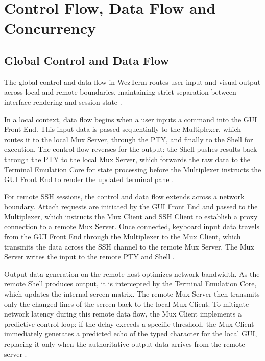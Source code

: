 \section{Control Flow, Data Flow and Concurrency}
\label{sec:control-data-concurrency}

\subsection{Global Control and Data Flow}
\label{sec:global-flow}

The global control and data flow in WezTerm routes user input and visual output across local and remote boundaries, maintaining strict separation between interface rendering and session state \cite{multiplexing,sshdomain,term-crate}.

In a local context, data flow begins when a user inputs a command into the GUI Front End. This input data is passed sequentially to the Multiplexer, which routes it to the local Mux Server, through the PTY, and finally to the Shell for execution. The control flow reverses for the output: the Shell pushes results back through the PTY to the local Mux Server, which forwards the raw data to the Terminal Emulation Core for state processing before the Multiplexer instructs the GUI Front End to render the updated terminal pane \cite{mux-api,term-crate}.

For remote SSH sessions, the control and data flow extends across a network boundary. Attach requests are initiated by the GUI Front End and passed to the Multiplexer, which instructs the Mux Client and SSH Client to establish a proxy connection to a remote Mux Server. Once connected, keyboard input data travels from the GUI Front End through the Multiplexer to the Mux Client, which transmits the data across the SSH channel to the remote Mux Server. The Mux Server writes the input to the remote PTY and Shell \cite{multiplexing,sshdomain,client-source}.

Output data generation on the remote host optimizes network bandwidth. As the remote Shell produces output, it is intercepted by the Terminal Emulation Core, which updates the internal screen matrix. The remote Mux Server then transmits only the changed lines of the screen back to the local Mux Client. To mitigate network latency during this remote data flow, the Mux Client implements a predictive control loop: if the delay exceeds a specific threshold, the Mux Client immediately generates a predicted echo of the typed character for the local GUI, replacing it only when the authoritative output data arrives from the remote server \cite{client-source,term-crate}.

